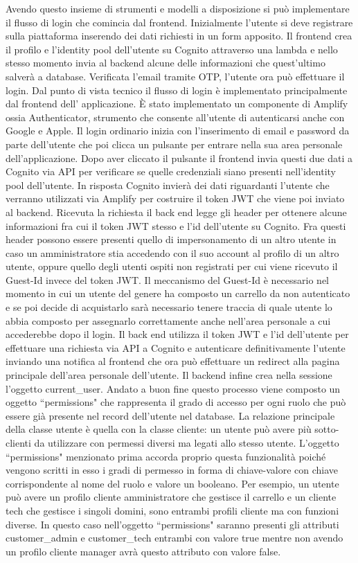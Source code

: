 \documentclass[target=bach,aauheader=,style=]{thud}
\begin{document}
Avendo questo insieme di strumenti e modelli a disposizione si può implementare il flusso di login che comincia dal frontend. Inizialmente l'utente si deve registrare sulla piattaforma inserendo dei dati
richiesti in un form apposito. Il frontend crea il profilo e l'identity pool dell'utente su Cognito attraverso una lambda e nello stesso momento invia al backend alcune delle informazioni che
quest'ultimo salverà a database. Verificata l'email tramite OTP, l'utente ora può effettuare il login. Dal punto di vista tecnico il flusso di login è implementato principalmente dal frontend dell'
applicazione. È stato implementato un componente di Amplify ossia Authenticator, strumento che consente all'utente di autenticarsi anche con Google e Apple. Il login ordinario inizia con l'inserimento di
email e password da parte dell'utente che poi clicca un pulsante per entrare nella sua area personale dell'applicazione. Dopo aver cliccato il pulsante il frontend invia questi due dati a Cognito via
API per verificare se quelle credenziali siano presenti nell'identity pool dell'utente. In risposta Cognito invierà dei dati riguardanti l'utente che verranno utilizzati via Amplify per costruire il
token JWT che viene poi inviato al backend. Ricevuta la richiesta il back end legge gli header per ottenere alcune informazioni fra cui il token JWT stesso e l'id dell'utente su Cognito.
Fra questi header possono essere presenti quello di impersonamento di un altro utente in caso un amministratore stia accedendo con il suo account al profilo
di un altro utente, oppure quello degli utenti ospiti non registrati per cui viene ricevuto il Guest-Id invece del token JWT. Il meccanismo del Guest-Id è necessario nel momento in cui un utente del
genere ha composto un carrello da non autenticato e se poi decide di acquistarlo sarà necessario tenere traccia di quale utente lo abbia composto per assegnarlo correttamente anche nell'area personale
a cui accederebbe dopo il login. Il back end utilizza il token JWT e l'id dell'utente per effettuare una richiesta via API a Cognito e autenticare definitivamente l'utente inviando una notifica al
frontend che ora può effettuare un redirect alla pagina principale dell'area personale dell'utente. Il backend infine crea nella sessione l'oggetto current\_user.
Andato a buon fine questo processo viene composto un oggetto ``permissions" che rappresenta il grado di accesso per ogni ruolo che può essere
già presente nel record dell'utente nel database. La relazione principale della classe utente è quella con la classe cliente: un utente può avere più sotto-clienti
da utilizzare con permessi diversi ma legati allo stesso utente. L'oggetto ``permissions" menzionato prima accorda proprio questa funzionalità poiché vengono
scritti in esso i gradi di permesso in forma di chiave-valore con chiave corrispondente al nome del ruolo e valore un booleano. Per esempio, un utente può avere un profilo
cliente amministratore che gestisce il carrello e un cliente tech che gestisce i singoli domini, sono entrambi profili cliente ma con funzioni diverse.
In questo caso nell'oggetto ``permissions" saranno presenti gli attributi customer\_admin e customer\_tech entrambi con valore true mentre non avendo un profilo cliente manager
avrà questo attributo con valore false.
\end{document}
